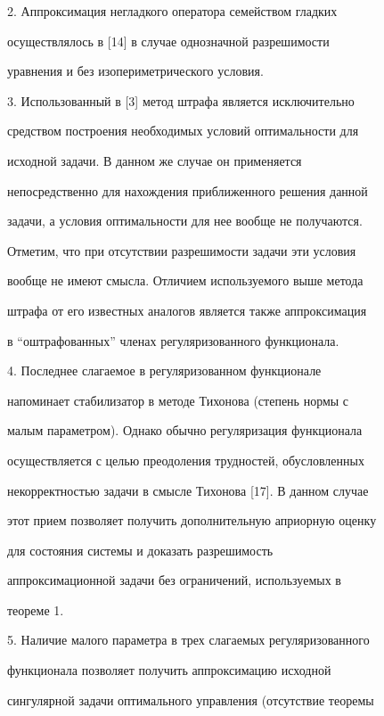  


2. Аппроксимация негладкого оператора семейством гладких 


осуществлялось в [14] в случае однозначной разрешимости 


уравнения и без изопериметрического условия. 


 


3. Использованный в [3] метод штрафа является исключительно 


средством построения необходимых условий оптимальности для 


исходной задачи. В данном же случае он применяется 


непосредственно для нахождения приближенного решения данной 


задачи, а условия оптимальности для нее вообще не получаются. 


Отметим, что при отсутствии разрешимости задачи эти условия 


вообще не имеют смысла. Отличием используемого выше метода 


штрафа от его известных аналогов является также аппроксимация 


в ``оштрафованных'' членах регуляризованного функционала. 


 


4. Последнее слагаемое в регуляризованном функционале 


напоминает стабилизатор в методе Тихонова (степень нормы с 


малым параметром). Однако обычно регуляризация функционала 


осуществляется с целью преодоления трудностей, обусловленных 


некорректностью задачи в смысле Тихонова [17]. В данном случае 


этот прием позволяет получить дополнительную априорную оценку 


для состояния системы и доказать разрешимость 


аппроксимационной задачи без ограничений, используемых в 


теореме 1. 


 


5. Наличие малого параметра в трех слагаемых регуляризованного 


функционала позволяет получить аппроксимацию исходной 


сингулярной задачи оптимального управления (отсутствие теоремы 


